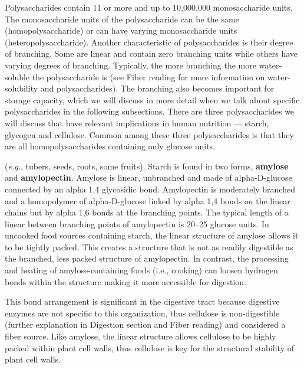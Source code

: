 \documentclass{tufte-handout}
\begin{document}
Polysaccharides contain 11 or more and up to 10,000,000 monosaccharide units. The monosaccharide units of the polysaccharide can be the same (homopolysaccharide) or can have varying monosaccharide units  (heteropolysaccharide). Another characteristic of polysaccharides is their degree of branching. Some are linear and contain zero branching units while others have varying degrees of branching. Typically, the more branching the more water-soluble the polysaccharide is (see Fiber reading for more information on water-solubility and polysaccharides). The branching also becomes important for storage capacity, which we will discuss in more detail when we talk about specific polysaccharides in the following subsections. There are three polysaccharides we will discuss that have relevant implications in human nutrition --- starch, glycogen and cellulose. Common among these three polysaccharides is that they are all homopolysaccharides containing only glucose units.

 (\textit{e.g.}, tubers, seeds, roots, some fruits). Starch is found in two forms, \textbf{amylose} and \textbf{amylopectin}. Amylose is linear, unbranched and made of alpha-D-glucose connected by an alpha 1,4 glycosidic bond. Amylopectin is moderately branched and a homopolymer of alpha-D-glucose linked by alpha 1,4 bonds on the linear chains but by alpha 1,6 bonds at the branching points. The typical length of a linear  between branching points of amylopectin is 20--25 glucose units. In uncooked food sources containing starch, the linear structure of amylose allows it to be tightly packed. This creates a structure that is not as readily digestible as the branched, less packed structure of amylopectin. In contrast, the processing and heating of amylose-containing foods (i.e., cooking) can loosen hydrogen bonds within the structure making it more accessible for digestion.

 This bond arrangement is significant in the digestive
tract because digestive enzymes are not specific to this organization, thus cellulose is non-digestible (further explanation in Digestion section and Fiber reading) and considered a fiber source. Like amylose, the linear structure allows cellulose to be highly packed within plant cell walls, thus cellulose is key for the structural stability of plant cell walls.
\end{document}
